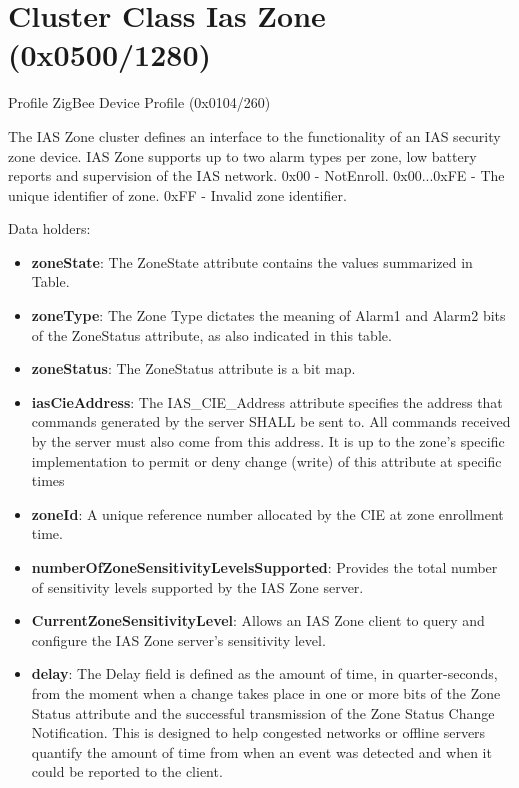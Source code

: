 \section{Cluster Class Ias Zone (0x0500/1280)}

Profile ZigBee Device Profile (0x0104/260)

The IAS Zone cluster defines an interface to the functionality of an IAS security zone device. IAS Zone supports up to two alarm types per zone, low battery reports and supervision of the IAS network. 			0x00 - NotEnroll. 			0x00...0xFE - The unique identifier of zone. 			0xFF - Invalid zone identifier.
\newline

\noindent
Data holders:

\begin{itemize}
\item \textbf{zoneState}: The ZoneState attribute contains the values summarized in Table.
\item \textbf{zoneType}: The Zone Type dictates the meaning of Alarm1 and Alarm2 bits of the ZoneStatus attribute, as also indicated in this table.
\item \textbf{zoneStatus}: The ZoneStatus attribute is a bit map.
\item \textbf{iasCieAddress}: The IAS\_CIE\_Address attribute specifies the address that commands generated by the server SHALL be sent to. All commands received by the server must also come from this address. It is up to the zone's specific implementation to permit or deny change (write) of this attribute at specific times
\item \textbf{zoneId}: A unique reference number allocated by the CIE at zone enrollment time.
\item \textbf{numberOfZoneSensitivityLevelsSupported}: Provides the total number of sensitivity levels supported by the IAS Zone server.
\item \textbf{CurrentZoneSensitivityLevel}: Allows an IAS Zone client to query and configure the IAS Zone server’s sensitivity level.
\item \textbf{delay}: The Delay field is defined as the amount of time, in quarter-seconds, from the moment when a change takes place in one or more bits of the Zone Status attribute and the successful transmission of the Zone Status Change Notification. This is designed to help congested networks or offline servers quantify the amount of time from when an event was detected and when it could be reported to the client.
\end{itemize}

